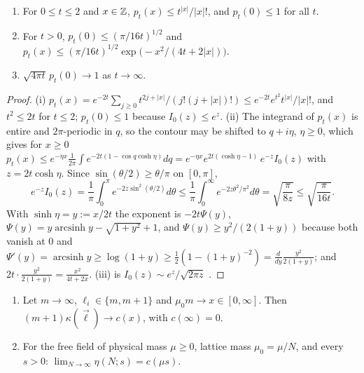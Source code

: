 \begin{lemma}\label{lem:freelimit}
\begin{enumerate}[label=\textup{(\roman*)},leftmargin=*]
\item For $0\le t\le2$ and $x\in\mathbb{Z}$, $p_t(x)\le t^{|x|}/|x|!$, and $p_t(0)\le1$
for all $t$.
\item For $t>0$, $p_t(0)\le(\pi/16t)^{1/2}$ and $p_t(x)\le(\pi/16t)^{1/2}
\exp\bigl(-x^2/(4t+2|x|)\bigr)$.
\item $\sqrt{4\pi t}\,p_t(0)\to1$ as $t\to\infty$.
\end{enumerate}
\end{lemma}

\begin{proof}
(i) $p_t(x)=e^{-2t}\sum_{j\ge0}t^{2j+|x|}/(j!(j+|x|)!)\le e^{-2t}e^{t^2}t^{|x|}/
|x|!$, and $t^2\le2t$ for $t\le2$; $p_t(0)\le1$ because $I_0(z)\le e^z$.
(ii) The integrand of $p_t(x)$ is entire and $2\pi$-periodic in $q$, so the
contour may be shifted to $q+i\eta$, $\eta\ge0$, which gives for $x\ge0$
$p_t(x)\le e^{-\eta x}\frac1{2\pi}\int e^{-2t(1-\cos q\cosh\eta)}dq=e^{-\eta x}
e^{2t(\cosh\eta-1)}\,e^{-z}I_0(z)$ with $z=2t\cosh\eta$. Since $\sin(\theta/2)
\ge\theta/\pi$ on $[0,\pi]$,
\[
e^{-z}I_0(z)=\frac1\pi\int_0^\pi e^{-2z\sin^2(\theta/2)}d\theta\le\frac1\pi
\int_0^\infty e^{-2z\theta^2/\pi^2}d\theta=\sqrt{\frac\pi{8z}}\le\sqrt{\frac
\pi{16t}} .
\]
With $\sinh\eta=y:=x/2t$ the exponent is $-2t\Psi(y)$, $\Psi(y)=y\operatorname{
arcsinh}y-\sqrt{1+y^2}+1$, and $\Psi(y)\ge y^2/(2(1+y))$ because both vanish at
$0$ and $\Psi'(y)=\operatorname{arcsinh}y\ge\log(1+y)\ge\frac12(1-(1+y)^{-2})=
\frac d{dy}\frac{y^2}{2(1+y)}$; and $2t\cdot\frac{y^2}{2(1+y)}=\frac{x^2}{4t+2x}$.
(iii) is $I_0(z)\sim e^z/\sqrt{2\pi z}$ \cite[\S7.23]{Wat44}.
\end{proof}

\begin{theorem}\label{thm:freelimit}
\begin{enumerate}[label=\textup{(\roman*)},leftmargin=*]
\item Let $m\to\infty$, $\ell_i\in\{m,m+1\}$ and $\mu_0m\to x\in[0,\infty]$.
Then $(m+1)\kappa(\vec\ell)\to c(x)$, with $c(\infty)=0$.
\item For the free field of physical mass $\mu\ge0$, lattice mass $\mu_0=
\mu/N$, and every $s>0$: $\lim_{N\to\infty}\eta(N;s)=c(\mu s)$.
\end{enumerate}
\end{theorem}

